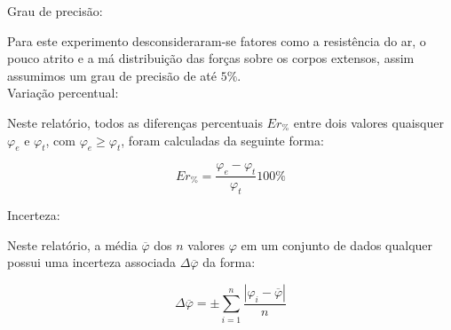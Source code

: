 \documentclass[
   12pt,                         %
   openright,                    %
   oneside,                      %
   a4paper,                      %
   sumario = tradicional,        %
   chapter=TITLE,                %
   section=TITLE,                %
   subsection=TITLE,             %
   subsubsection=TITLE,          %
   english,                      %
   french,                       %
   spanish,                      %
   brazil,                       %
   xcolor=table                  %
]{abntex2}
\begin{document}
      \noindent Grau de precisão:

      Para este experimento desconsideraram-se fatores como a resistência do ar, o pouco atrito e a má distribuição das forças 
      sobre os corpos extensos, assim assumimos um grau de precisão de até $5\%$. \\

      \noindent Variação percentual:

      Neste relatório, todos as diferenças percentuais $Er_\%$ entre dois valores quaisquer $\varphi_e$ e $\varphi_t$, com 
      $\varphi_e\geq\varphi_t$, foram 
      calculadas da seguinte forma:

      \begin{equation} \label{eq:errper}
         Er_\% = \frac{\varphi_e - \varphi_t}{\varphi_t}100\%
      \end{equation}

      \noindent Incerteza:

      Neste relatório, a média $\overline{\varphi}$ dos $n$ valores $\varphi$ em um conjunto de dados qualquer possui uma 
      incerteza associada $\Delta \overline{\varphi}$ da forma:

      \begin{equation}\label{eq:incet}
         \Delta \overline{\varphi} = ± \sum_{i=1}^{n} \frac{| \varphi_i - \overline{\varphi}|}{n}
      \end{equation}

   
\end{document}
